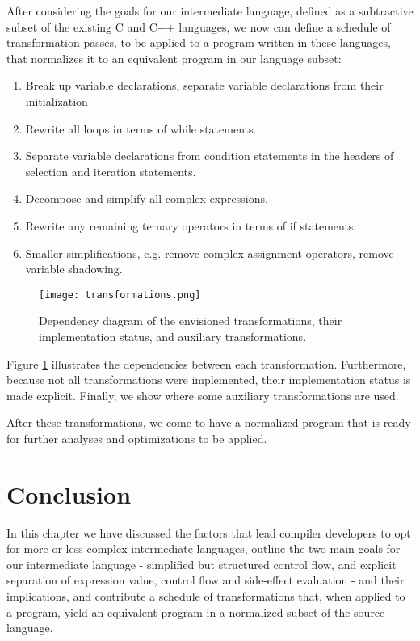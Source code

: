 After considering the goals for our intermediate language, defined as a subtractive subset of the existing C and C++ languages, we now can define a schedule of transformation passes, to be applied to a program written in these languages, that normalizes it to an equivalent program in our language subset:

\begin{enumerate}
    \item Break up variable declarations, separate variable declarations from their initialization
    \item Rewrite all loops in terms of while statements.
    \item Separate variable declarations from condition statements in the headers of selection and iteration statements.
    \item Decompose and simplify all complex expressions.
    \item Rewrite any remaining ternary operators in terms of if statements.
    \item Smaller simplifications, e.g. remove complex assignment operators, remove variable shadowing.
\end{enumerate}

\begin{figure}
    \centering
    \texttt{[image: transformations.png]}
    \caption{Dependency diagram of the envisioned transformations, their implementation status, and auxiliary transformations.}
    \label{fig:transform-diagram}
\end{figure}

Figure \ref{fig:transform-diagram} illustrates the dependencies between each transformation. Furthermore, because not all transformations were implemented, their implementation status is made explicit. Finally, we show where some auxiliary transformations are used.

After these transformations, we come to have a normalized program that is ready for further analyses and optimizations to be applied.

\section{Conclusion}

In this chapter we have discussed the factors that lead compiler developers to opt for more or less complex intermediate languages, outline the two main goals for our intermediate language - simplified but structured control flow, and explicit separation of expression value, control flow and side-effect evaluation - and their implications, and contribute a schedule of transformations that, when applied to a program, yield an equivalent program in a normalized subset of the source language.
